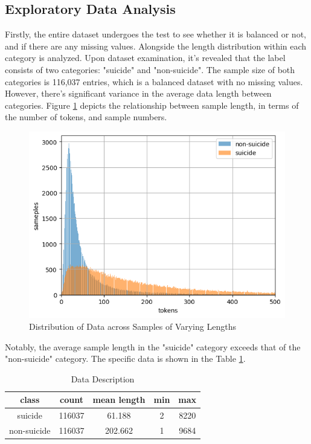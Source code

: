 \documentclass[ %
                    author={Bocheng Wang},
                supervisor={Dr. Qiang Liu},
                    degree={MSc},
                     title={A Research on Identification of Suicide Ideation in Texts with Multiple Models},
                      type={},
                      year={2024}]{dissertation}
\begin{document}
\subsection{Exploratory Data Analysis}
\noindent
Firstly, the entire dataset undergoes the test to see whether it is balanced or not, and if there are any missing values. Alongside the length distribution within each category is analyzed. Upon dataset examination, it's revealed that the label consists of two categories: "suicide" and "non-suicide". The sample size of both categories is 116,037 entries, which is a balanced dataset with no missing values. However, there's significant variance in the average data length between categories. Figure \ref{fig:describe} depicts the relationship between sample length, in terms of the number of tokens, and sample numbers. 

\begin{figure}[h]
      \centering
      \includegraphics[width=0.6\linewidth]{../img/data_describe.png}
      \caption{Distribution of Data across Samples of Varying Lengths}
      \label{fig:describe}
\end{figure}

Notably, the average sample length in the "suicide" category exceeds that of the "non-suicide" category. The specific data is shown in the Table \ref{tab:describe}.

\begin{table}[h]
      \centering
      \begin{tabular}{ccccc}
            \hline
            class & count & mean length & min & max \\
            \hline
            suicide     & 116037 & 61.188  & 2 & 8220 \\
            non-suicide & 116037 & 202.662 & 1 & 9684 \\
            \hline
      \end{tabular}
      \caption{Data Description}
      \label{tab:describe}
\end{table}
\end{document}
